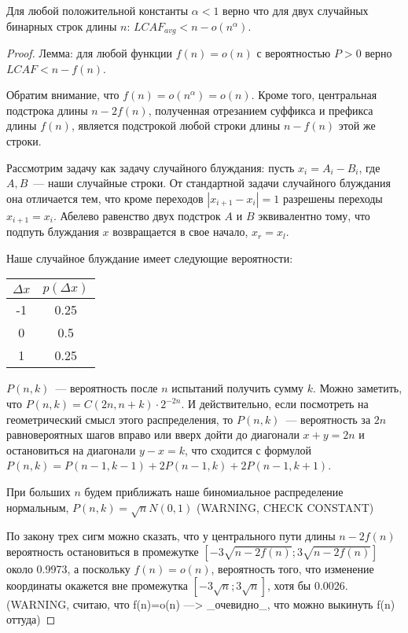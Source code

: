 \begin{theorem}
Для любой положительной константы $\alpha<1$ верно что для двух случайных бинарных строк длины $n$: $LCAF_{avg} < n - o(n^\alpha)$.
\end{theorem}
\begin{proof}

Лемма: для любой функции $f(n)=o(n)$ с вероятностью $P>0$ верно $LCAF < n - f(n)$.

Обратим внимание, что $f(n) = o(n^\alpha) = o(n)$. Кроме того, центральная подстрока длины $n-2f(n)$, полученная отрезанием суффикса и префикса длины $f(n)$, является подстрокой любой строки длины $n-f(n)$ этой же строки.

Рассмотрим задачу как задачу случайного блуждания: пусть $x_i = A_i - B_i$, где $A, B$~--- наши случайные строки. От стандартной задачи случайного блуждания она отличается тем, что кроме переходов $|x_{i+1}-x_i|=1$ разрешены переходы $x_{i+1}=x_i$. Абелево равенство двух подстрок $A$ и $B$ эквивалентно тому, что подпуть блуждания $x$ возвращается в свое начало, $x_r=x_l$.

Наше случайное блуждание имеет следующие вероятности:

\begin{tabular}{|c|c|}
\hline
$\Delta x$ & $p(\Delta x)$ \\
\hline
-1 & 0.25 \\
\hline
0 & 0.5 \\
\hline
1 & 0.25 \\
\hline
\end{tabular}

$P(n, k)$~--- вероятность после $n$ испытаний получить сумму $k$. Можно заметить, что $P(n, k)=C(2n, n+k)\cdot 2^{-2n}$. И действительно, если посмотреть на геометрический смысл этого распределения, то $P(n,k)$~--- вероятность за $2n$ равновероятных шагов вправо или вверх дойти до диагонали $x+y=2n$ и остановиться на диагонали $y-x=k$, что сходится с формулой $P(n,k)=P(n-1,k-1)+2P(n-1,k)+2P(n-1,k+1)$.

При больших $n$ будем приближать наше биномиальное распределение нормальным, $P(n, k)=\sqrt n N(0,1)$ (WARNING, CHECK CONSTANT)

По закону трех сигм можно сказать, что у центрального пути длины $n-2f(n)$ вероятность остановиться в промежутке $[-3\sqrt{n-2f(n)}; 3\sqrt{n-2f(n)}]$ около 0.9973, а поскольку $f(n)=o(n)$, вероятность того, что изменение координаты окажется вне промежутка $[-3\sqrt{n}; 3\sqrt{n}]$, хотя бы 0.0026. (WARNING, считаю, что f(n)=o(n) ---> \_очевидно\_, что можно выкинуть f(n) оттуда)


\end{proof}
